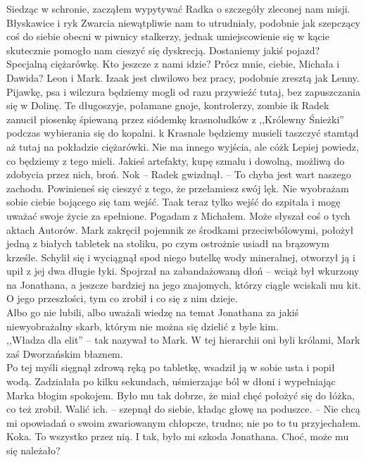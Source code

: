 \documentclass[../MAIN.tex]{subfiles}
\begin{document}
Siedząc w schronie, zacząłem wypytywać Radka o szczegóły zleconej nam misji. Błyskawice i ryk Zwarcia niewątpliwie nam to utrudniały, podobnie jak szepczący coś do siebie obecni w piwnicy stalkerzy, jednak umiejscowienie się w kącie skutecznie pomogło nam cieszyć się dyskrecją.
\sx Dostaniemy jakiś pojazd?
\xx Specjalną ciężarówkę.
\xx Kto jeszcze z nami idzie?
\xx Prócz mnie, ciebie, Michała i Dawida? Leon i Mark. Izaak jest chwilowo bez pracy, podobnie zresztą jak Lenny. Pijawkę, psa i wilczura będziemy mogli od razu przywieźć tutaj, bez zapuszczania się w Dolinę. Te długoszyje, połamane gnoje, kontrolerzy, zombie i\3k
\qd
Radek zanucił piosenkę śpiewaną przez siódemkę krasnoludków z ,,Królewny Śnieżki'' podczas wybierania się do kopalni.
\sx \3k Krasnale będziemy musieli taszczyć stamtąd aż tutaj na pokładzie ciężarówki. Nie ma innego wyjścia, ale cóż\3k
\xx Lepiej powiedz, co będziemy z tego mieli.
\xx Jakieś artefakty, kupę szmalu i dowolną, możliwą do zdobycia przez nich, broń.
\xx No\3k -- Radek gwizdnął. -- To chyba jest wart naszego zachodu.
\xx Powinieneś się cieszyć z tego, że przełamiesz swój lęk. Nie wyobrażam sobie ciebie bojącego się tam wejść.
\xx Taa\3k teraz tylko wejść do szpitala i mogę uważać swoje życie za spełnione. Pogadam z Michałem. Może słyszał coś o tych aktach Autorów.
\qd
% 
% 
Mark zakręcił pojemnik ze środkami przeciwbólowymi, położył jedną z białych tabletek na stoliku, po czym ostrożnie usiadł na brązowym krześle. Schylił się i wyciągnął spod niego butelkę wody mineralnej, otworzył ją i upił z jej dwa długie łyki. Spojrzał na zabandażowaną dłoń -- wciąż był wkurzony na Jonathana, a jeszcze bardziej na jego znajomych, którzy ciągle wciskali mu kit. O jego przeszłości, tym co zrobił i co się z nim dzieje.\\
Albo go nie lubili, albo uważali wiedzę na temat Jonathana za jakiś niewyobrażalny skarb, którym nie można się dzielić z byle kim.\\
,,Władza dla elit'' -- tak nazywał to Mark. W tej hierarchii oni byli królami, Mark zaś Dworzańskim błaznem.\\
Po tej myśli sięgnął zdrową ręką po tabletkę, wsadził ją w sobie usta i popił wodą. Zadziałała po kilku sekundach, uśmierzając ból w dłoni i wypełniając Marka błogim spokojem. Było mu tak dobrze, że miał chęć położyć się do łóżka, co też zrobił.
\sx Walić ich. -- szepnął do siebie, kładąc głowę na poduszce. -- Nie chcą mi opowiadań o swoim zwariowanym chłopcze, trudno; nie po to tu przyjechałem.
Koka. To wszystko przez nią.
I tak, było mi szkoda Jonathana. Choć, może mu się należało?
\qd
\end{document}
